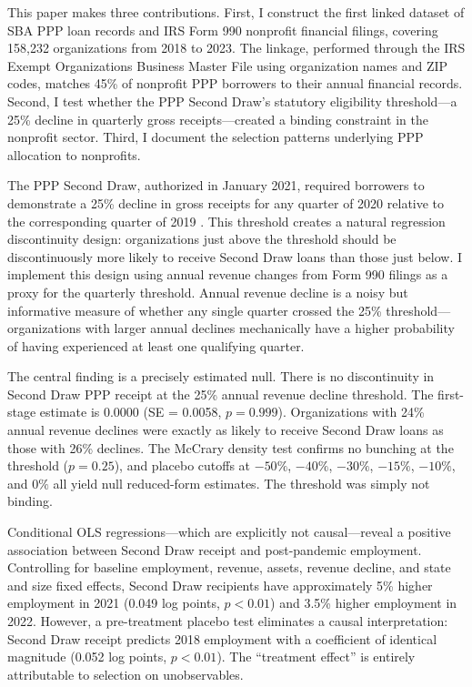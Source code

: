 \documentclass[12pt]{article}
\begin{document}
This paper makes three contributions. First, I construct the first linked dataset of SBA PPP loan records and IRS Form 990 nonprofit financial filings, covering 158,232 organizations from 2018 to 2023. The linkage, performed through the IRS Exempt Organizations Business Master File using organization names and ZIP codes, matches 45\% of nonprofit PPP borrowers to their annual financial records. Second, I test whether the PPP Second Draw's statutory eligibility threshold---a 25\% decline in quarterly gross receipts---created a binding constraint in the nonprofit sector. Third, I document the selection patterns underlying PPP allocation to nonprofits.

The PPP Second Draw, authorized in January 2021, required borrowers to demonstrate a 25\% decline in gross receipts for any quarter of 2020 relative to the corresponding quarter of 2019 \citep{sba2021}. This threshold creates a natural regression discontinuity design: organizations just above the threshold should be discontinuously more likely to receive Second Draw loans than those just below. I implement this design using annual revenue changes from Form 990 filings as a proxy for the quarterly threshold. Annual revenue decline is a noisy but informative measure of whether any single quarter crossed the 25\% threshold---organizations with larger annual declines mechanically have a higher probability of having experienced at least one qualifying quarter.

The central finding is a precisely estimated null. There is no discontinuity in Second Draw PPP receipt at the 25\% annual revenue decline threshold. The first-stage estimate is 0.0000 (SE = 0.0058, $p = 0.999$). Organizations with 24\% annual revenue declines were exactly as likely to receive Second Draw loans as those with 26\% declines. The McCrary density test confirms no bunching at the threshold ($p = 0.25$), and placebo cutoffs at $-50\%$, $-40\%$, $-30\%$, $-15\%$, $-10\%$, and $0\%$ all yield null reduced-form estimates. The threshold was simply not binding.

Conditional OLS regressions---which are explicitly not causal---reveal a positive association between Second Draw receipt and post-pandemic employment. Controlling for baseline employment, revenue, assets, revenue decline, and state and size fixed effects, Second Draw recipients have approximately 5\% higher employment in 2021 (0.049 log points, $p < 0.01$) and 3.5\% higher employment in 2022. However, a pre-treatment placebo test eliminates a causal interpretation: Second Draw receipt predicts 2018 employment with a coefficient of identical magnitude (0.052 log points, $p < 0.01$). The ``treatment effect'' is entirely attributable to selection on unobservables.
\end{document}
